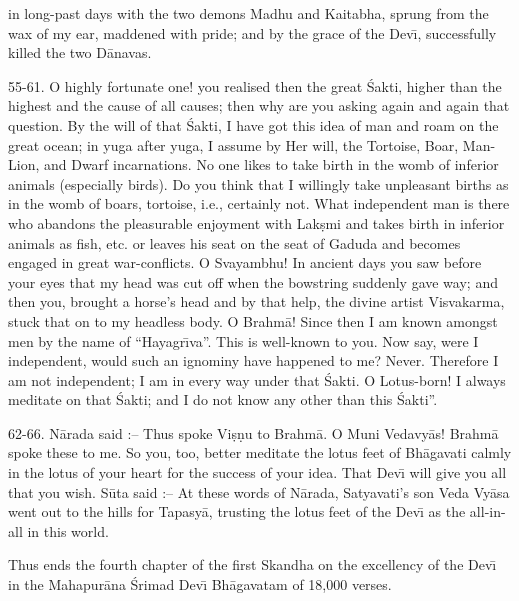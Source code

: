 in long-past days with the two demons Madhu and Kaitabha, sprung from the wax of my ear, maddened with pride; and by the grace of the Dev\={\i}, successfully killed the two D\=anavas.

55-61. O highly fortunate one! you realised then the great \'Sakti, higher than the highest and the cause of all causes; then why are you asking again and again that question. By the will of that \'Sakti, I have got this idea of man and roam on the great ocean; in yuga after yuga, I assume by Her will, the Tortoise, Boar, Man-Lion, and Dwarf incarnations. No one likes to take birth in the womb of inferior animals (especially birds). Do you think that I willingly take unpleasant births as in the womb of boars, tortoise, i.e., certainly not. What independent man is there who abandons the pleasurable enjoyment with Lak\d{s}mi and takes birth in inferior animals as fish, etc. or leaves his seat on the seat of Gaduda and becomes engaged in great war-conflicts. O Svayambhu! In ancient days you saw before your eyes that my head was cut off when the bowstring suddenly gave way; and then you, brought a horse's head and by that help, the divine artist Visvakarma, stuck that on to my headless body. O Brahm\=a! Since then I am known amongst men by the name of ``Hayagr\={\i}va''. This is well-known to you. Now say, were I independent, would such an ignominy have happened to me? Never. Therefore I am not independent; I am in every way under that \'Sakti. O Lotus-born! I always meditate on that \'Sakti; and I do not know any other than this \'Sakti''.

62-66. N\=arada said :-- Thus spoke Vi\d{s}\d{n}u to Brahm\=a. O Muni Vedavy\=as! Brahm\=a spoke these to me. So you, too, better meditate the lotus feet of Bh\=agavati calmly in the lotus of your heart for the success of your idea. That Dev\={\i} will give you all that you wish. S\=uta said :-- At these words of N\=arada, Satyavati's son Veda Vy\=asa went out to the hills for Tapasy\=a, trusting the lotus feet of the Dev\={\i} as the all-in-all in this world.

Thus ends the fourth chapter of the first Skandha on the excellency of the Dev\={\i} in the Mahapur\=ana \'Srimad Dev\={\i} Bh\=agavatam of 18,000 verses.



